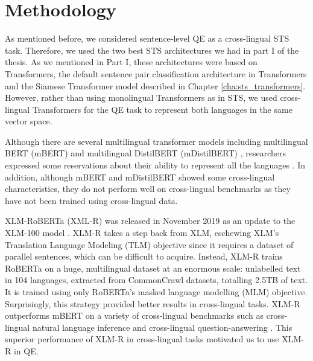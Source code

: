 \section{Methodology}
\label{sec:transquest_method}
As mentioned before, we considered sentence-level QE as a cross-lingual STS task. Therefore, we used the two best STS architectures we had in part I of the thesis. As we mentioned in Part I, these architectures were based on Transformers, the default sentence pair classification architecture in Transformers and the Siamese Transformer model described in Chapter \ref{cha:sts_transformers}. However, rather than using monolingual Transformers as in STS, we used cross-lingual Transformers for the QE task to represent both languages in the same vector space.

Although there are several multilingual transformer models including multilingual BERT (mBERT) \autocite{devlin-etal-2019-bert} and multilingual DistilBERT (mDistilBERT) \autocite{Sanh2019DistilBERTAD}, researchers expressed some reservations about their ability to represent all the languages \autocite{pires-etal-2019-multilingual}. In addition, although mBERT and mDistilBERT showed some cross-lingual characteristics, they do not perform well on cross-lingual benchmarks \autocite{karthikeyan2020cross} as they have not been trained using cross-lingual data. 

XLM-RoBERTa (XML-R) was released in November 2019 \autocite{conneau-etal-2020-unsupervised} as an update to the XLM-100 model \autocite{lample2019cross}. XLM-R takes a step back from XLM, eschewing XLM's Translation Language Modeling (TLM) objective since it requires a dataset of parallel sentences, which can be difficult to acquire. Instead, XLM-R trains RoBERTa \autocite{liu2019roberta} on a huge, multilingual dataset at an enormous scale: unlabelled text in 104 languages, extracted from CommonCrawl datasets, totalling 2.5TB of text. It is trained using only RoBERTa's \autocite{liu2019roberta} masked language modelling (MLM) objective. Surprisingly, this strategy provided better results in cross-lingual tasks. XLM-R outperforms mBERT on a variety of cross-lingual benchmarks such as cross-lingual natural language inference and cross-lingual question-answering \autocite{conneau-etal-2020-unsupervised}. This superior performance of XLM-R in cross-lingual tasks motivated us to use XLM-R in QE. 

